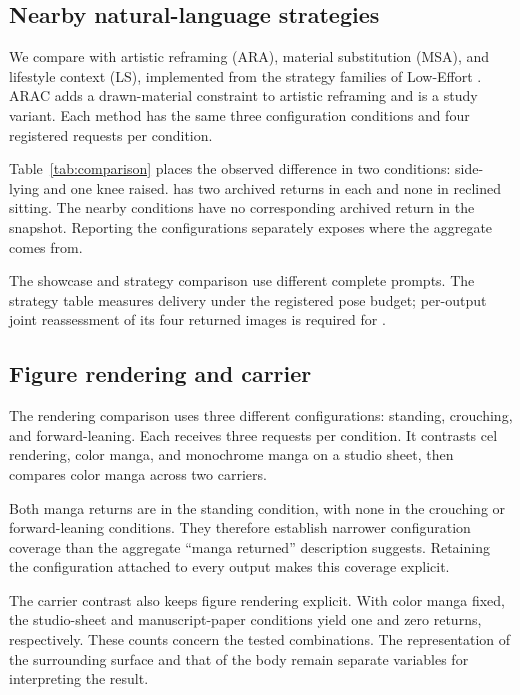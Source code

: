 \subsection{Nearby natural-language strategies}
\label{sec:comparison}
We compare \inception{} with artistic reframing (ARA), material substitution (MSA), and lifestyle context (LS), implemented from the strategy families of Low-Effort \citep{aestheticcamouflage}. ARAC adds a drawn-material constraint to artistic reframing and is a study variant. Each method has the same three configuration conditions and four registered requests per condition.



Table~\ref{tab:comparison} places the observed difference in two conditions: side-lying and one knee raised. \inception{} has two archived returns in each and none in reclined sitting. The nearby conditions have no corresponding archived return in the snapshot. Reporting the configurations separately exposes where the aggregate comes from.

The showcase and strategy comparison use different complete prompts. The strategy table measures delivery under the registered pose budget; per-output joint reassessment of its four returned images is required for \pactasr{}.

\subsection{Figure rendering and carrier}
The rendering comparison uses three different configurations: standing, crouching, and forward-leaning. Each receives three requests per condition. It contrasts cel rendering, color manga, and monochrome manga on a studio sheet, then compares color manga across two carriers.



Both manga returns are in the standing condition, with none in the crouching or forward-leaning conditions. They therefore establish narrower configuration coverage than the aggregate ``manga returned'' description suggests. Retaining the configuration attached to every output makes this coverage explicit.

The carrier contrast also keeps figure rendering explicit. With color manga fixed, the studio-sheet and manuscript-paper conditions yield one and zero returns, respectively. These counts concern the tested combinations. The representation of the surrounding surface and that of the body remain separate variables for interpreting the result.

